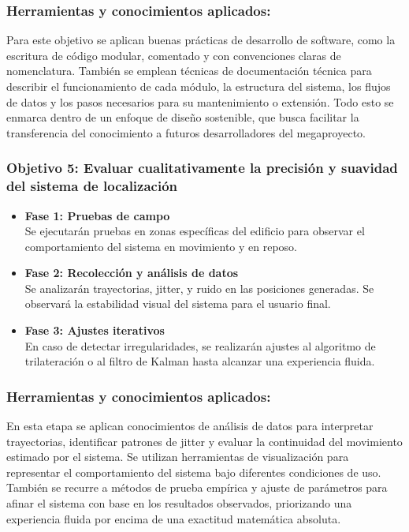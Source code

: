 \documentclass{article}
\begin{document}
\subsubsection{Herramientas y conocimientos aplicados:} 
{\justify Para este objetivo se aplican buenas prácticas de desarrollo de software, como la escritura de código modular, comentado y con convenciones claras de nomenclatura. También se emplean técnicas de documentación técnica para describir el funcionamiento de cada módulo, la estructura del sistema, los flujos de datos y los pasos necesarios para su mantenimiento o extensión. Todo esto se enmarca dentro de un enfoque de diseño sostenible, que busca facilitar la transferencia del conocimiento a futuros desarrolladores del megaproyecto.}

\subsubsection{Objetivo 5: Evaluar cualitativamente la precisión y suavidad del sistema de localización}

\begin{itemize}
    \item \textbf{Fase 1: Pruebas de campo} \\
    Se ejecutarán pruebas en zonas específicas del edificio para observar el comportamiento del sistema en movimiento y en reposo.

    \item \textbf{Fase 2: Recolección y análisis de datos} \\
    Se analizarán trayectorias, jitter, y ruido en las posiciones generadas. Se observará la estabilidad visual del sistema para el usuario final.

    \item \textbf{Fase 3: Ajustes iterativos} \\
    En caso de detectar irregularidades, se realizarán ajustes al algoritmo de trilateración o al filtro de Kalman hasta alcanzar una experiencia fluida.
\end{itemize}

\subsubsection{Herramientas y conocimientos aplicados:} 
{\justify En esta etapa se aplican conocimientos de análisis de datos para interpretar trayectorias, identificar patrones de jitter y evaluar la continuidad del movimiento estimado por el sistema. Se utilizan herramientas de visualización para representar el comportamiento del sistema bajo diferentes condiciones de uso. También se recurre a métodos de prueba empírica y ajuste de parámetros para afinar el sistema con base en los resultados observados, priorizando una experiencia fluida por encima de una exactitud matemática absoluta.}
\end{document}
